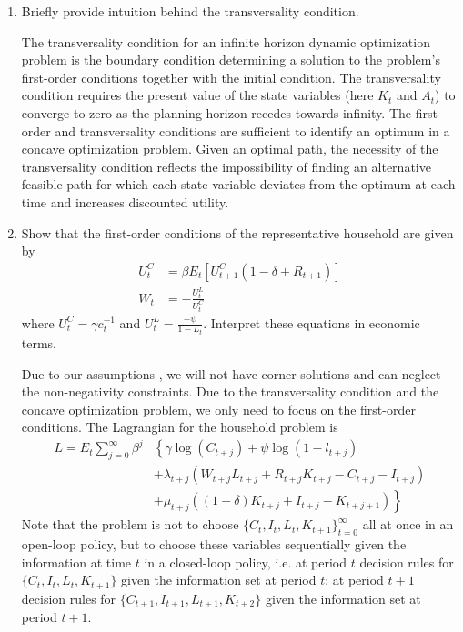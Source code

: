 \documentclass[a4paper]{scrartcl}
\begin{document}
	\begin{enumerate}
		\item Briefly provide intuition behind the transversality condition.
		\begin{solution}
			The transversality condition for an infinite horizon dynamic optimization problem is the boundary condition determining a solution to the problem's first-order conditions together with the initial condition. The transversality condition requires the present value of the state variables (here $K_t$ and $A_t$) to converge to zero as the planning horizon recedes towards infinity. The first-order and transversality conditions are sufficient to identify an optimum in a concave optimization problem. Given an optimal path, the necessity of the transversality condition reflects the impossibility of finding an alternative feasible path for which each state variable deviates from the optimum at each time and increases discounted utility.
		\end{solution}
		\item Show that the first-order conditions of the representative household are given by
		\begin{align*}
			 U_t^C &= \beta E_t\left[U_{t+1}^C\left(1-\delta + R_{t+1}\right)\right]\\
			W_t &= -\frac{U_t^L}{U_t^C}
		\end{align*}
		where $U_t^C=\gamma c_t^{-1}$ and $U_t^L = \frac{-\psi}{1-L_t}$. Interpret these equations in economic terms.
		\begin{solution}
		Due to our assumptions , we will not have corner solutions and can neglect the non-negativity constraints. Due to the transversality condition and the concave optimization problem, we only need to focus on the first-order conditions. 
		The Lagrangian for the household problem is
		\begin{align*}
		L = E_t\sum_{j=0}^{\infty}\beta^j&\left\{\gamma \log(C_{t+j}) + \psi \log(1-l_{t+j})\right.\\
		&+\lambda_{t+j}\left(W_{t+j} L_{t+j} + R_{t+j} K_{t+j} - C_{t+j} - I_{t+j}\right)\\
		&+ \left. \mu_{t+j} \left((1-\delta)K_{t+j} + I_{t+j} - K_{t+j+1}\right)\right\}
		\end{align*}
		Note that the problem is not to choose $\{C_t,I_t,L_t,K_{t+1}\}_{t=0}^\infty$ all at once in an open-loop policy, but to choose these variables sequentially given the information at time $t$ in a closed-loop policy, i.e. at period $t$ decision rules for $\{C_t,I_t,L_t,K_{t+1}\}$ given the information set at period $t$; at period $t+1$ decision rules for $\{C_{t+1},I_{t+1},L_{t+1},K_{t+2}\}$ given the information set at period $t+1$.


\end{solution}
\end{enumerate}
\end{document}
